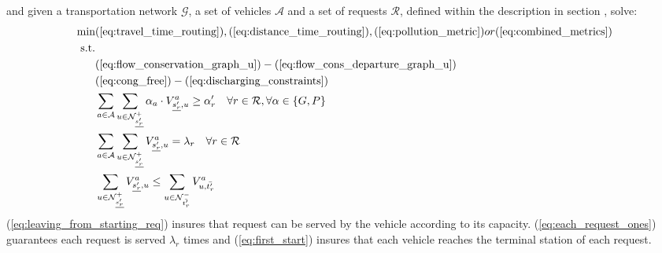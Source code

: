 and given a transportation network $\mathcal{G}$, a set of vehicles $\mathcal{A}$ and a set of requests $\mathcal{R}$, defined within the description in section , solve:\\
\begin{align}
	\text{min}&  
		(\ref{eq:travel_time_routing}), (\ref{eq:distance_time_routing}), (\ref{eq:pollution_metric}) or (\ref{eq:combined_metrics})
	\nonumber\\
	\text{s.t.} &\nonumber\\
	&(\ref{eq:flow_conservation_graph_u})-(\ref{eq:flow_cons_departure_graph_u})\nonumber\\
	&(\ref{eq:cong_free})-(\ref{eq:discharging_constraints})\nonumber\\
	&\sum_{ a \in \mathcal{A} }
	\sum_{u \in \mathcal{N}^+_{\underline{s'_r}} } \alpha_a \cdot V^a_{ \underline{s'_r}, u} \ge \alpha'_r \quad \forall r \in \mathcal{R}, \forall \alpha \in \{G, P\}	\label{eq:leaving_from_starting_req}\\
	&\sum_{ a \in \mathcal{A} }\sum_{u \in \mathcal{N}^+_{\underline{s'_r}} } V^a_{ \underline{s'_r}, u} =\lambda_r\quad \forall r \in \mathcal{R}	\label{eq:each_request_ones}\\
	&\sum_{u \in \mathcal{N}^+_{\underline{s'_r}} }  V^a_{ \underline{s'_r}, u} \leq \sum_{u \in \mathcal{N}^-_{\bar{t'_r}} }  V^a_{u,\bar{t'_r}} \label{eq:first_start}
\end{align}
(\ref{eq:leaving_from_starting_req}) insures that request can be served by the vehicle according to its capacity. (\ref{eq:each_request_ones}) guarantees each request is served $\lambda_r$ times and (\ref{eq:first_start}) insures that each vehicle reaches the terminal station of each request. 

